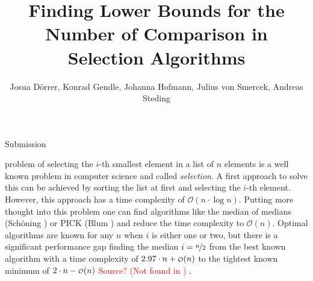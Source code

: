 \documentclass[10pt,journal,compsoc]{IEEEtran}
\newcommand\smallO{
  \mathchoice
    {{\scriptstyle\mathcal{O}}}%
    {{\scriptstyle\mathcal{O}}}%
    {{\scriptscriptstyle\mathcal{O}}}%
    {\scalebox{.50}{$\scriptscriptstyle\mathcal{O}$}}%
  }
\begin{document}
\title{Finding Lower Bounds for the Number of Comparison in Selection Algorithms}

\author{Josua Dörrer, Konrad Gendle, Johanna Hofmann, Julius von Smercek, Andreas Steding%
  }

%
{Submission}



\maketitle

\IEEEdisplaynontitleabstractindextext


\IEEEpeerreviewmaketitle

  problem of selecting the $i$-th smallest element in a list of $n$ elements is
a well known problem in computer science and called \textit{selection}. A first approach to solve
this can be achieved by sorting the list at first and selecting the $i$-th element. However, this
approach has a time complexity of $\mathcal{O}(n \cdot \log n)$. Putting more thought into this
problem one can find algorithms like the median of medians (Schöning \cite{Schoening1993}) or PICK
(Blum \cite{Blum1972}) and reduce the time complexity to $\mathcal{O}(n)$. Optimal algorithms are
known for any $n$ when $i$ is either one or two, but there is a significant performance gap finding
the median $i = \nicefrac{n}{2}$ from the best known algorithm with a time complexity of $2.97 \cdot
  n + \smallO(n)$ to the tightest known minimum of $2 \cdot n - \smallO(n)$ \textcolor{red}{Source? (Not found in \cite{Knuth1973})} .
\end{document}

